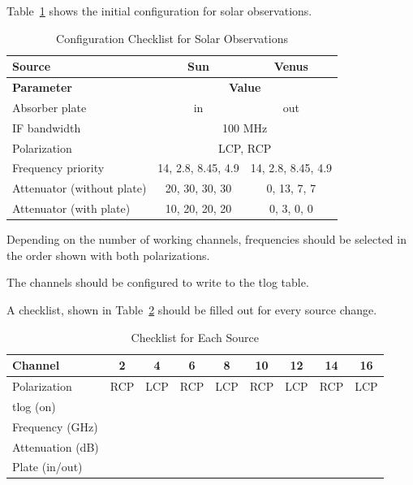 \documentclass[letterpaper,11pt]{report}
\begin{document}
Table~\ref{tab:solar_cfg} shows the initial configuration for solar observations.
\begin{table}[h!tb]
    \begin{center}
        \caption{\label{tab:solar_cfg}Configuration Checklist for Solar Observations}
        \begin{tabular}{|l|c|c|}
\hline
Source                & Sun         &   Venus \\
\hline
{\bfseries Parameter} & \multicolumn{2}{c|}{\bfseries Value} \\
\hline
Absorber plate        & in          &    out \\
\hline
IF bandwidth          & \multicolumn{2}{c|}{100 MHz} \\
\hline
Polarization          & \multicolumn{2}{c|}{LCP, RCP} \\
\hline
Frequency priority    & 14, 2.8,  8.45,  4.9 & 14, 2.8,  8.45,  4.9 \\
\hline
Attenuator (without plate) & 20, 30, 30, 30 & 0, 13, 7, 7      \\
Attenuator (with plate)    & 10, 20, 20, 20 & 0, 3, 0, 0 \\
\hline
        \end{tabular}
    \end{center}
\end{table}
Depending on the number of working channels, frequencies should be selected in
the order shown with both polarizations.

The channels should be configured to write to the {\ttfamily tlog} table.

A checklist, shown in Table~\ref{tab:checklist} should be filled out for every source change.
\begin{table}[h!tb]
    \begin{center}\label{tab:checklist}
        \caption{Checklist for Each Source}
        \begin{tabular}{|l|c|c|c|c|c|c|c|c|}
\hline
Channel               & 2   &  4  &  6  &  8  & 10  & 12  & 14  & 16 \\
\hline
Polarization          & RCP & LCP & RCP & LCP & RCP & LCP & RCP & LCP \\
\hline
{\ttfamily t}log (on) &     &     &     &     &     &     &     &     \\
\hline
Frequency (GHz)       & \multicolumn{2}{c|}{} & \multicolumn{2}{c|}{} & \multicolumn{2}{c|}{} & \multicolumn{2}{c|}{} \\
\hline
Attenuation (dB)      & \multicolumn{2}{c|}{} & \multicolumn{2}{c|}{} & \multicolumn{2}{c|}{} & \multicolumn{2}{c|}{} \\
\hline
Plate (in/out)        & \multicolumn{8}{c|}{ } \\
\hline
        \end{tabular}
    \end{center}
\end{table}
\end{document}

